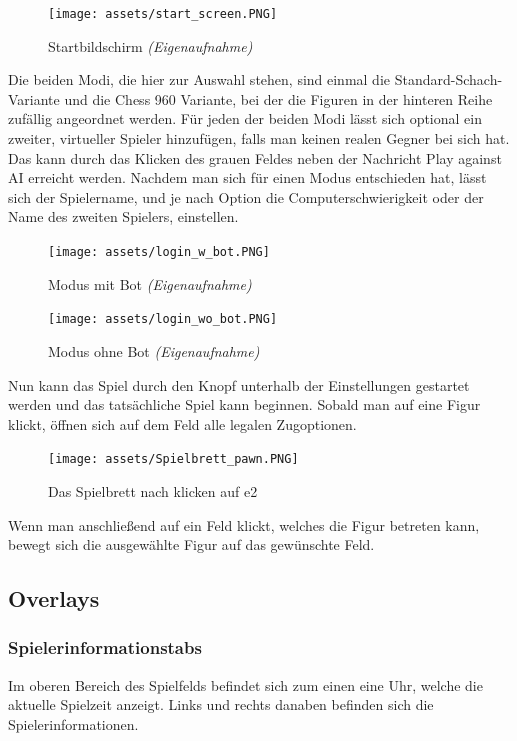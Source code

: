 \documentclass[a4paper, 10pt]{scrartcl}
\begin{document}
\begin{figure}[h]
        \centering
        \texttt{[image: assets/start\_screen.PNG]}
        \caption{Startbildschirm \textit{(Eigenaufnahme)}}
\end{figure}
Die beiden Modi, die hier zur Auswahl stehen, sind einmal die Standard-Schach-Variante und die Chess 960 Variante,
bei der die Figuren in der hinteren Reihe zufällig angeordnet werden.
Für jeden der beiden Modi lässt sich optional ein zweiter, virtueller Spieler hinzufügen, falls man keinen realen Gegner bei sich hat.
Das kann durch das Klicken des grauen Feldes neben der Nachricht \glqq{}Play against AI \grqq erreicht werden.
Nachdem man sich für einen Modus entschieden hat, lässt sich der Spielername, und je nach Option die Computerschwierigkeit oder der Name des zweiten Spielers, einstellen.
\begin{figure}[!h]
        \centering
        \begin{minipage}[b]{.4\linewidth} %
           \texttt{[image: assets/login\_w\_bot.PNG]}
           \caption{Modus mit Bot \textit{(Eigenaufnahme)}}
        \end{minipage}
        \hspace{.1\linewidth}%
        \begin{minipage}[b]{.4\linewidth} %
           \texttt{[image: assets/login\_wo\_bot.PNG]}
           \caption{Modus ohne Bot \textit{(Eigenaufnahme)}}
        \end{minipage}
\end{figure}

Nun kann das Spiel durch den Knopf unterhalb der Einstellungen gestartet werden und das tatsächliche Spiel kann beginnen.
Sobald man auf eine Figur klickt, öffnen sich auf dem Feld alle legalen Zugoptionen.

\begin{figure}[h]
        \centering
        \texttt{[image: assets/Spielbrett\_pawn.PNG]}
        \caption{Das Spielbrett nach klicken auf e2}
\end{figure}
Wenn man anschließend auf ein Feld klickt, welches die Figur betreten kann, bewegt
sich die ausgewählte Figur auf das gewünschte Feld.

\subsection{Overlays}

\subsubsection{Spielerinformationstabs}
Im oberen Bereich des Spielfelds befindet sich zum einen eine Uhr, welche die aktuelle Spielzeit anzeigt. Links und rechts danaben befinden sich die Spielerinformationen.
\end{document}
